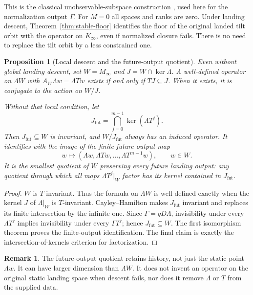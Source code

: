 \documentclass[11pt]{amsart}
\newtheorem{proposition}[theorem]{Proposition}
\theoremstyle{definition}
\newtheorem{remark}[theorem]{Remark}
\begin{document}
This is the classical unobservable-subspace construction
\cite{Kalman1963,BoydLall}, used here for the normalization output \(\Gamma\).
For \(M=0\) all spaces and ranks are zero. Under landing descent,
Theorem~\ref{thm:stable-floor} identifies the floor of the original landed tilt
orbit with the operator on \(K_\infty\), even if normalized closure fails.
There is no need to replace the tilt orbit by a less constrained one.


\begin{proposition}[Local descent and the future-output quotient]\label{prop:local-descent}
Even without global landing descent, set \(W=M_\infty\) and
\(J=W\cap\ker\Lambda\). A well-defined operator on \(\Lambda W\) with
\(A_W\Lambda w=\Lambda Tw\) exists if and only if \(TJ\subseteq J\).
When it exists, it is conjugate to the action on \(W/J\).

Without that local condition, let
\[
J_{\mathrm{fut}}=\bigcap_{j=0}^{m-1}\ker(\Lambda T^j).
\]
Then \(J_{\mathrm{fut}}\subseteq W\) is invariant, and \(W/J_{\mathrm{fut}}\)
always has an induced operator. It identifies with the image of the finite
future-output map
\[
w\longmapsto(\Lambda w,\Lambda Tw,\ldots,\Lambda T^{m-1}w),\qquad w\in W.
\]
It is the smallest quotient of \(W\) preserving every future landing output:
any quotient through which all maps \(\Lambda T^j|_W\) factor has its kernel
contained in \(J_{\mathrm{fut}}\).
\end{proposition}
\begin{proof}
\(W\) is \(T\)-invariant. Thus the formula on \(\Lambda W\) is well-defined
exactly when the kernel \(J\) of \(\Lambda|_W\) is \(T\)-invariant.
Cayley--Hamilton makes \(J_{\mathrm{fut}}\) invariant and replaces its finite
intersection by the infinite one. Since \(\Gamma=qD\Lambda\), invisibility
under every \(\Lambda T^j\) implies invisibility under every \(\Gamma T^j\);
hence \(J_{\mathrm{fut}}\subseteq W\).
The first isomorphism theorem proves the finite-output identification.
The final claim is exactly the intersection-of-kernels criterion for factorization.
\end{proof}

\begin{remark}
The future-output quotient retains history, not just the static point \(\Lambda w\).
It can have larger dimension than \(\Lambda W\). It does not invent an operator
on the original static landing space when descent fails, nor does it remove
\(\Lambda\) or \(T\) from the supplied data.
\end{remark}
\end{document}
